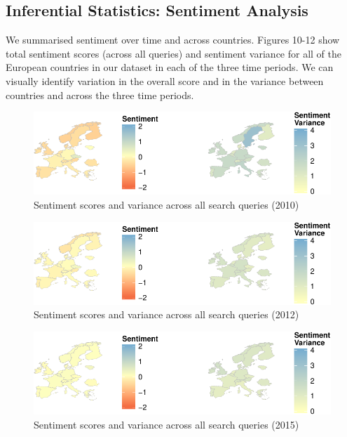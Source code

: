 \documentclass[]{article}
\begin{document}
\newpage

\subsection{Inferential Statistics: Sentiment
Analysis}\label{inferential-statistics-sentiment-analysis}

We summarised sentiment over time and across countries. Figures 10-12
show total sentiment scores (across all queries) and sentiment variance
for all of the European countries in our dataset in each of the three
time periods. We can visually identify variation in the overall score
and in the variance between countries and across the three time periods.

\begin{figure}[htbp]
\centering
\includegraphics{fin_paper_files/figure-latex/unnamed-chunk-12-1.pdf}
\caption{Sentiment scores and variance across all search queries (2010)}
\end{figure}

\begin{figure}[htbp]
\centering
\includegraphics{fin_paper_files/figure-latex/unnamed-chunk-13-1.pdf}
\caption{Sentiment scores and variance across all search queries (2012)}
\end{figure}

\begin{figure}[htbp]
\centering
\includegraphics{fin_paper_files/figure-latex/unnamed-chunk-14-1.pdf}
\caption{Sentiment scores and variance across all search queries (2015)}
\end{figure}
\end{document}
